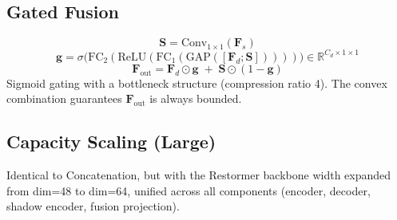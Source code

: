 \documentclass[pdflatex,sn-basic,Numbered]{sn-jnl}
\theoremstyle{thmstyleone}
\theoremstyle{thmstyletwo}
\theoremstyle{thmstylethree}
\begin{document}
\begin{appendices}
\subsection*{Gated Fusion}
\begin{equation}
  \mathbf{S} = \text{Conv}_{1\times1}(\mathbf{F}_s)
\end{equation}
\begin{equation}
  \mathbf{g} = \sigma\big(\text{FC}_2(\text{ReLU}(\text{FC}_1(\text{GAP}([\mathbf{F}_d; \mathbf{S}]))))\big) \in \mathbb{R}^{C_d \times 1 \times 1}
\end{equation}
\begin{equation}
  \mathbf{F}_{\text{out}} = \mathbf{F}_d \odot \mathbf{g} \;+\; \mathbf{S} \odot (1 - \mathbf{g})
\end{equation}
Sigmoid gating with a bottleneck structure (compression ratio 4). The convex combination guarantees $\mathbf{F}_{\text{out}}$ is always bounded.

\subsection*{Capacity Scaling (Large)}
Identical to Concatenation, but with the Restormer backbone width expanded from dim=48 to dim=64, unified across all components (encoder, decoder, shadow encoder, fusion projection).

\end{appendices}


\end{document}
